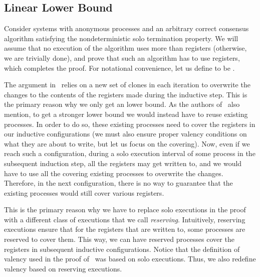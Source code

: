 \subsection{Linear Lower Bound}
\label{sec:linbound}
Consider systems with  anonymous processes and an arbitrary correct consensus algorithm 
  satisfying the nondeterministic solo termination property. 
We will assume that no execution of the algorithm uses more than  registers (otherwise, we are trivially done),
  and prove that such an algorithm has to use  registers, which completes the proof.
For notational convenience, let us define  to be .

The argument in~ relies on a new set of clones in each iteration 
  to overwrite the changes to the contents of the registers made during the inductive step. 
This is the primary reason why we only get an  lower bound.
As the authors of~\cite{FHS98} also mention,
  to get a stronger lower bound we would instead have to reuse existing processes.
In order to do so, these existing processes need to cover the registers in our inductive configurations
  (we must also ensure proper valency conditions on what they are about to write, but let us focus on the covering).
Now, even if we reach such a configuration, 
  during a solo execution interval of some process in the subsequent induction step, all the registers may get written to,
  and we would have to use all the covering existing processes to overwrite the changes.
Therefore, in the next configuration, there is no way to guarantee that the existing processes 
  would still cover various registers.

This is the primary reason why we have to replace solo executions in the proof with a different class of executions
  that we call \emph{reserving}.
Intuitively, reserving executions ensure that for the registers that are written to, 
  some processes are reserved to cover them.
This way, we can have reserved processes cover the registers in subsequent inductive configurations.
Notice that the definition of valency used in the proof of~ was based on solo executions.
Thus, we also redefine valency based on reserving executions. 
